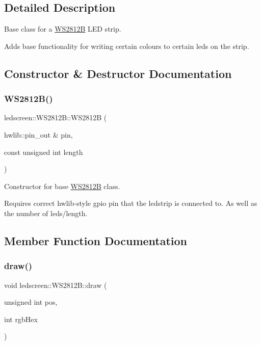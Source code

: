 \subsection{Detailed Description}
Base class for a \hyperlink{classledscreen_1_1WS2812B}{W\+S2812B} L\+ED strip. 

Adds base functionality for writing certain colours to certain leds on the strip. 

\subsection{Constructor \& Destructor Documentation}
\mbox{\label{classledscreen_1_1WS2812B_aad8aa07db255de9439972e7e5689836d}} 
\subsubsection{\texorpdfstring{W\+S2812\+B()}{WS2812B()}}
{\footnotesize\ttfamily ledscreen\+::\+W\+S2812\+B\+::\+W\+S2812B (\begin{DoxyParamCaption}\item[{hwlib\+::pin\+\_\+out \&}]{pin,  }\item[{const unsigned int}]{length }\end{DoxyParamCaption})\hspace{0.3cm}{\ttfamily [inline]}}



Constructor for base \hyperlink{classledscreen_1_1WS2812B}{W\+S2812B} class. 

Requires correct hwlib-\/style gpio pin that the ledstrip is connected to. As well as the number of leds/length. 

\subsection{Member Function Documentation}
\mbox{\label{classledscreen_1_1WS2812B_a6a2ebfd923258e9e23d278ff41d875bf}} 
\subsubsection{\texorpdfstring{draw()}{draw()}\hspace{0.1cm}{\footnotesize\ttfamily [1/2]}}
{\footnotesize\ttfamily void ledscreen\+::\+W\+S2812\+B\+::draw (\begin{DoxyParamCaption}\item[{unsigned int}]{pos,  }\item[{int}]{rgb\+Hex }\end{DoxyParamCaption})\hspace{0.3cm}{\ttfamily [inline]}}



